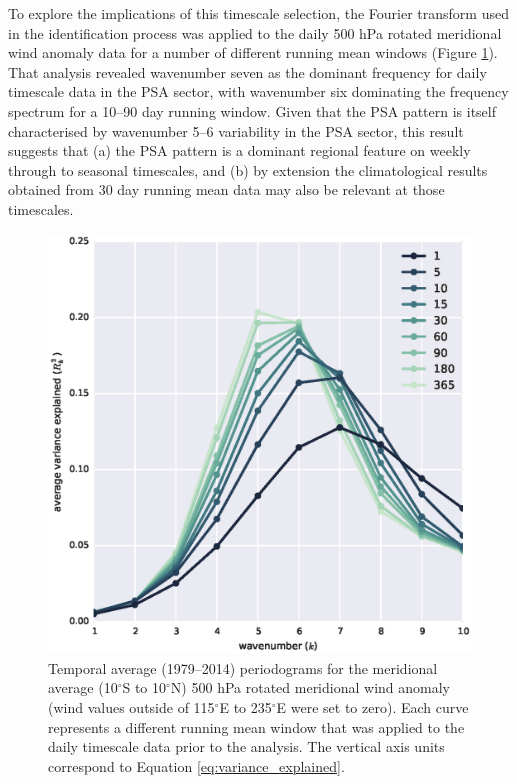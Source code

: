 To explore the implications of this timescale selection, the Fourier transform used in the identification process was applied to the daily 500 hPa rotated meridional wind anomaly data for a number of different running mean windows (Figure \ref{fig:periodogram}). That analysis revealed wavenumber seven as the dominant frequency for daily timescale data in the PSA sector, with wavenumber six dominating the frequency spectrum for a 10--90 day running window. Given that the PSA pattern is itself characterised by wavenumber 5--6 variability in the PSA sector, this result suggests that (a) the PSA pattern is a dominant regional feature on weekly through to seasonal timescales, and (b) by extension the climatological results obtained from 30 day running mean data may also be relevant at those timescales.

\begin{figure}
\begin{center}
\includegraphics[width=0.7\columnwidth]{figures/psa/Figure4-3.eps}
\caption[Temporal average (1979--2014) periodograms for the meridional average (10$^{\circ}$S to 10$^{\circ}$N) 500 hPa rotated meridional wind anomaly]{\label{fig:periodogram}
Temporal average (1979--2014) periodograms for the meridional average (10$^{\circ}$S to 10$^{\circ}$N) 500 hPa rotated meridional wind anomaly (wind values outside of 115$^{\circ}$E to 235$^{\circ}$E were set to zero). Each curve represents a different running mean window that was applied to the daily timescale data prior to the analysis. The vertical axis units correspond to Equation \ref{eq:variance_explained}.%
}
\end{center}
\end{figure}


